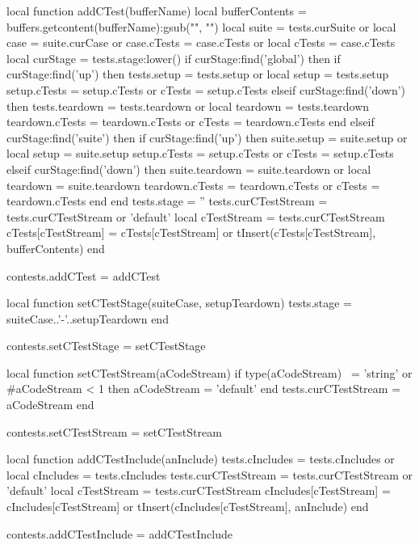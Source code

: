 \startLuaCode
local function addCTest(bufferName)
  local bufferContents = buffers.getcontent(bufferName):gsub("", "\n")
  local suite          = tests.curSuite  or { }
  local case           = suite.curCase   or { }
  case.cTests          = case.cTests     or { }
  local cTests         = case.cTests
  local curStage       = tests.stage:lower()
  if curStage:find('global') then
    if curStage:find('up') then
      tests.setup      = tests.setup     or { }
      local setup      = tests.setup
      setup.cTests     = setup.cTests    or { }
      cTests           = setup.cTests
    elseif curStage:find('down') then
      tests.teardown   = tests.teardown  or { }
      local teardown   = tests.teardown
      teardown.cTests  = teardown.cTests or { }
      cTests           = teardown.cTests
    end
  elseif curStage:find('suite') then
    if curStage:find('up') then
      suite.setup      = suite.setup     or { }
      local setup      = suite.setup
      setup.cTests     = setup.cTests    or { }
      cTests           = setup.cTests
    elseif curStage:find('down') then
      suite.teardown   = suite.teardown  or { }
      local teardown   = suite.teardown
      teardown.cTests  = teardown.cTests or { }
      cTests           = teardown.cTests
    end
  end
  tests.stage          = ''
  tests.curCTestStream = tests.curCTestStream or 'default'
  local cTestStream    = tests.curCTestStream
  cTests[cTestStream]  = cTests[cTestStream] or { }
  tInsert(cTests[cTestStream], bufferContents)
end

contests.addCTest = addCTest

local function setCTestStage(suiteCase, setupTeardown)
  tests.stage = suiteCase..'-'..setupTeardown
end

contests.setCTestStage = setCTestStage

local function setCTestStream(aCodeStream)
  if type(aCodeStream) ~= 'string'
    or #aCodeStream < 1 then
    aCodeStream = 'default'
  end
  tests.curCTestStream = aCodeStream
end

contests.setCTestStream = setCTestStream

local function addCTestInclude(anInclude)
  tests.cIncludes        = tests.cIncludes or { }
  local cIncludes        = tests.cIncludes
  tests.curCTestStream   = tests.curCTestStream or 'default'
  local cTestStream      = tests.curCTestStream
  cIncludes[cTestStream] = cIncludes[cTestStream] or { }
  tInsert(cIncludes[cTestStream], anInclude)
end

contests.addCTestInclude = addCTestInclude

